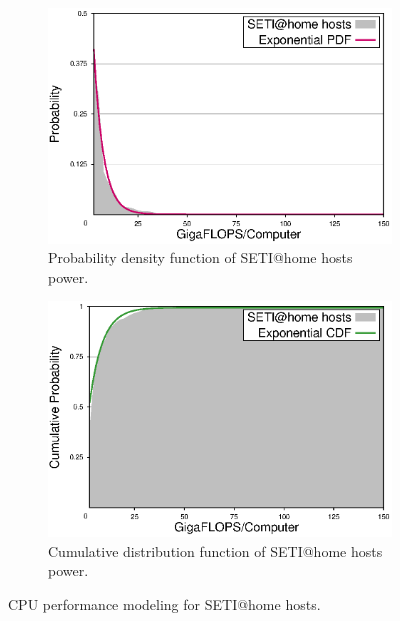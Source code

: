 \begin{appendices}
\begin{figure}[htbp] 
	\begin{subfigure}{0.5\textwidth}
		\includegraphics[width=\linewidth]{figures/density}
		\captionsetup{width=.9\textwidth}
		\caption{Probability density function of SETI@home hosts power.} 
		\label{fig:pdf}
	\end{subfigure}
	\hspace*{\fill} %
	\begin{subfigure}{0.5\textwidth}
		\includegraphics[width=\linewidth]{figures/distribution}
		\captionsetup{width=.9\textwidth}
		\caption{Cumulative distribution function of SETI@home hosts power.} 
		\label{fig:cdf}
	\end{subfigure}
	\caption{CPU performance modeling for SETI@home hosts.}
	\label{fig:exponential}
\end{figure}



\end{appendices}
